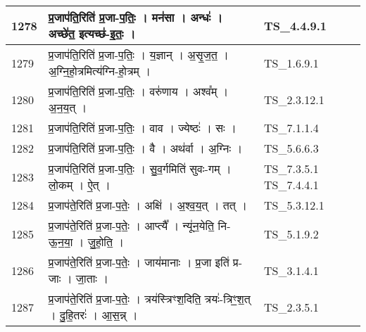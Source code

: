 \documentclass[17pt]{extarticle}
\begin{document}
\begin{longtable}{||p{0.4in}||p{4.9in}||p{0.9in}||}
    \hline
        
    1278 & प्र॒जाप॑ति॒रिति॑ प्र॒जा{-}प॒तिः॒   ।   मन॑सा   ।   अन्धः॑   ।   अच्छे॑त॒ इत्यच्छ॑{-}इ॒तः॒   ।    & TS\_4.4.9.1       \\
    
    \hline
        
    1279 & प्र॒जाप॑ति॒रिति॑ प्र॒जा{-}प॒तिः॒   ।   य॒ज्ञान्   ।   अ॒सृ॒ज॒त॒   ।   अ॒ग्नि॒हो॒त्रमित्य॑ग्नि{-}हो॒त्रम्   ।    & TS\_1.6.9.1       \\
    
    \hline
        
    1280 & प्र॒जाप॑ति॒रिति॑ प्र॒जा{-}प॒तिः॒   ।   वरु॑णाय   ।   अश्व᳚म्   ।   अ॒न॒य॒त्   ।    & TS\_2.3.12.1       \\
    
    \hline
        
    1281 & प्र॒जाप॑ति॒रिति॑ प्र॒जा{-}प॒तिः॒   ।   वाव   ।   ज्येष्ठः॑   ।   सः   ।    & TS\_7.1.1.4       \\
    
    \hline
        
    1282 & प्र॒जाप॑ति॒रिति॑ प्र॒जा{-}प॒तिः॒   ।   वै   ।   अथ॑र्वा   ।   अ॒ग्निः   ।    & TS\_5.6.6.3       \\
    
    \hline
        
    1283 & प्र॒जाप॑ति॒रिति॑ प्र॒जा{-}प॒तिः॒   ।   सु॒व॒र्गमिति॑ सुवः{-}गम्   ।   लो॒कम्   ।   ऐ॒त्   ।    & TS\_7.3.5.1 TS\_7.4.4.1       \\
    
    \hline
        
    1284 & प्र॒जाप॑ते॒रिति॑ प्र॒जा{-}प॒तेः॒   ।   अक्षि॑   ।   अ॒श्व॒य॒त्   ।   तत्   ।    & TS\_5.3.12.1       \\
    
    \hline
        
    1285 & प्र॒जाप॑ते॒रिति॑ प्र॒जा{-}प॒तेः॒   ।   आप्त्यै᳚   ।   न्यू॑न॒येति॒ नि{-}ऊ॒न॒या॒   ।   जु॒हो॒ति॒   ।    & TS\_5.1.9.2       \\
    
    \hline
        
    1286 & प्र॒जाप॑ते॒रिति॑ प्र॒जा{-}प॒तेः॒   ।   जाय॑मानाः   ।   प्र॒जा इति॑ प्र{-}जाः   ।   जा॒ताः   ।    & TS\_3.1.4.1       \\
    
    \hline
        
    1287 & प्र॒जाप॑ते॒रिति॑ प्र॒जा{-}प॒तेः॒   ।   त्रय॑स्त्रिꣳश॒दिति॒ त्रयः॑{-}त्रिꣳ॒॒श॒त्   ।   दु॒हि॒तरः॑   ।   आ॒स॒न्न्   ।    & TS\_2.3.5.1       \\
    

\end{longtable}
\end{document}

